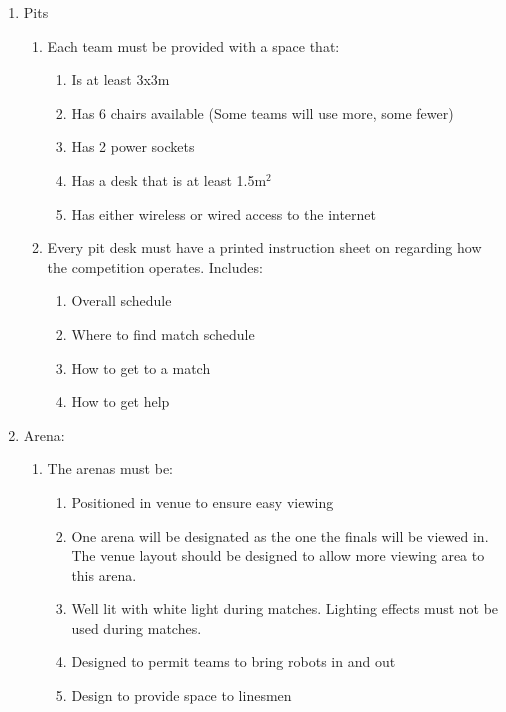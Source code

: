 \begin{enumerate}
\begin{enumerate}
  \item Pits
    \begin{enumerate}
    \item Each team must be provided with a space that:
      \begin{enumerate}
      \item Is at least 3x3m
      \item Has 6 chairs available (Some teams will use more, some fewer)
      \item Has 2 power sockets
      \item Has a desk that is at least 1.5m$^2$
      \item Has either wireless or wired access to the internet
      \end{enumerate}

    \item Every pit desk must have a printed instruction sheet on regarding how the competition operates.  Includes:
      \begin{enumerate}
      \item Overall schedule
      \item Where to find match schedule
      \item How to get to a match
      \item How to get help
      \end{enumerate}
    \end{enumerate}

  \item Arena:
    \begin{enumerate}
    \item The arenas must be:
      \begin{enumerate}
      \item Positioned in venue to ensure easy viewing
      \item One arena will be designated as the one the finals will be viewed in.  The venue layout should be designed to allow more viewing area to this arena.

      \item Well lit with white light during matches.  Lighting effects must not be used during matches.
      \item Designed to permit teams to bring robots in and out
      \item Design to provide space to linesmen
      \end{enumerate}
    \end{enumerate}


\end{enumerate}
\end{enumerate}

